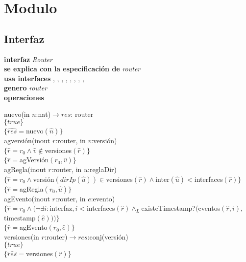 \section{Modulo }

\subsection*{Interfaz}
\textbf{interfaz} \textit{Router}\\
\textbf{se explica con la especificaci\'on de} \textit{router}\\
\textbf{usa interfaces} , , , , , , , , \\
\textbf{genero} \textit{router}\\
\textbf{operaciones}

nuevo(in $n$:nat)$\rightarrow res$: router\\
$\{true\}$\\
$\{\widehat{res}=$nuevo$(\widehat{n})\}$\\

agversi\'on(inout $r$:router, in $v$:versi\'on)\\
$\{\widehat{r}= r_0 \wedge \widehat{v} \notin $versiones$(\widehat{r})\}$\\
$\{\widehat{r}=$agVersi\'on$(r_0,\widehat{v})\}$\\

agRegla(inout $r$:router, in $u$:reglaDir)\\
$\{\widehat{r}=r_0 \wedge $versi\'on$(dirIp(\widehat{u}))\in $versiones$(\widehat{r}) \wedge $inter$(\widehat{u}) < $interfaces$(\widehat{r})\}$\\
$\{\widehat{r}=$agRegla$(r_0,\widehat{u})\}$\\

agEvento(inout $r$:router, in $e$:evento)\\
$\{\widehat{r}=r_0 \wedge (\neg \exists i: $interfaz$, i < $interfaces$(\widehat{r}) \wedge_L $existeTimestamp?$($eventos$(\widehat{r},i),$timestamp$(\widehat{e})))\}$\\
$\{\widehat{r}=$agEvento$(r_0,\widehat{e})\}$\\

versiones(in $r$:router)$\longrightarrow res$:conj(versi\'on)\\
$\{true\}$\\
$\{\widehat{res}=$versiones$(\widehat{r})\}$\\

